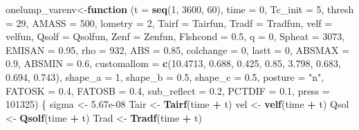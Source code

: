 \documentclass[]{article}
\newenvironment{Shaded}{\begin{snugshade}}{\end{snugshade}}
\newcommand{\KeywordTok}[1]{\textcolor[rgb]{0.13,0.29,0.53}{\textbf{#1}}}
\newcommand{\DataTypeTok}[1]{\textcolor[rgb]{0.13,0.29,0.53}{#1}}
\newcommand{\DecValTok}[1]{\textcolor[rgb]{0.00,0.00,0.81}{#1}}
\newcommand{\FloatTok}[1]{\textcolor[rgb]{0.00,0.00,0.81}{#1}}
\newcommand{\StringTok}[1]{\textcolor[rgb]{0.31,0.60,0.02}{#1}}
\newcommand{\ControlFlowTok}[1]{\textcolor[rgb]{0.13,0.29,0.53}{\textbf{#1}}}
\newcommand{\OperatorTok}[1]{\textcolor[rgb]{0.81,0.36,0.00}{\textbf{#1}}}
\newcommand{\NormalTok}[1]{#1}
\begin{document}
\begin{Shaded}
\begin{Highlighting}[]
\NormalTok{onelump_varenv<-}\ControlFlowTok{function}\NormalTok{ (}\DataTypeTok{t =} \KeywordTok{seq}\NormalTok{(}\DecValTok{1}\NormalTok{, }\DecValTok{3600}\NormalTok{, }\DecValTok{60}\NormalTok{), }\DataTypeTok{time =} \DecValTok{0}\NormalTok{, }\DataTypeTok{Tc_init =} \DecValTok{5}\NormalTok{, }\DataTypeTok{thresh =} \DecValTok{29}\NormalTok{, }
    \DataTypeTok{AMASS =} \DecValTok{500}\NormalTok{, }\DataTypeTok{lometry =} \DecValTok{2}\NormalTok{, }\DataTypeTok{Tairf =}\NormalTok{ Tairfun, }\DataTypeTok{Tradf =}\NormalTok{ Tradfun, }
    \DataTypeTok{velf =}\NormalTok{ velfun, }\DataTypeTok{Qsolf =}\NormalTok{ Qsolfun, }\DataTypeTok{Zenf =}\NormalTok{ Zenfun, }\DataTypeTok{Flshcond =} \FloatTok{0.5}\NormalTok{, }
    \DataTypeTok{q =} \DecValTok{0}\NormalTok{, }\DataTypeTok{Spheat =} \DecValTok{3073}\NormalTok{, }\DataTypeTok{EMISAN =} \FloatTok{0.95}\NormalTok{, }\DataTypeTok{rho =} \DecValTok{932}\NormalTok{, }\DataTypeTok{ABS =} \FloatTok{0.85}\NormalTok{, }
    \DataTypeTok{colchange =} \DecValTok{0}\NormalTok{, }\DataTypeTok{lastt =} \DecValTok{0}\NormalTok{, }\DataTypeTok{ABSMAX =} \FloatTok{0.9}\NormalTok{, }\DataTypeTok{ABSMIN =} \FloatTok{0.6}\NormalTok{, }\DataTypeTok{customallom =} \KeywordTok{c}\NormalTok{(}\FloatTok{10.4713}\NormalTok{, }
        \FloatTok{0.688}\NormalTok{, }\FloatTok{0.425}\NormalTok{, }\FloatTok{0.85}\NormalTok{, }\FloatTok{3.798}\NormalTok{, }\FloatTok{0.683}\NormalTok{, }\FloatTok{0.694}\NormalTok{, }\FloatTok{0.743}\NormalTok{), }\DataTypeTok{shape_a =} \DecValTok{1}\NormalTok{, }
    \DataTypeTok{shape_b =} \FloatTok{0.5}\NormalTok{, }\DataTypeTok{shape_c =} \FloatTok{0.5}\NormalTok{, }\DataTypeTok{posture =} \StringTok{"n"}\NormalTok{, }\DataTypeTok{FATOSK =} \FloatTok{0.4}\NormalTok{, }
    \DataTypeTok{FATOSB =} \FloatTok{0.4}\NormalTok{, }\DataTypeTok{sub_reflect =} \FloatTok{0.2}\NormalTok{, }\DataTypeTok{PCTDIF =} \FloatTok{0.1}\NormalTok{, }\DataTypeTok{press =} \DecValTok{101325}\NormalTok{) }
\NormalTok{\{}
\NormalTok{    sigma <-}\StringTok{ }\FloatTok{5.67e-08}
\NormalTok{    Tair <-}\StringTok{ }\KeywordTok{Tairf}\NormalTok{(time }\OperatorTok{+}\StringTok{ }\NormalTok{t)}
\NormalTok{    vel <-}\StringTok{ }\KeywordTok{velf}\NormalTok{(time }\OperatorTok{+}\StringTok{ }\NormalTok{t)}
\NormalTok{    Qsol <-}\StringTok{ }\KeywordTok{Qsolf}\NormalTok{(time }\OperatorTok{+}\StringTok{ }\NormalTok{t)}
\NormalTok{    Trad <-}\StringTok{ }\KeywordTok{Tradf}\NormalTok{(time }\OperatorTok{+}\StringTok{ }\NormalTok{t)}

\end{Highlighting}
\end{Shaded}
\end{document}
